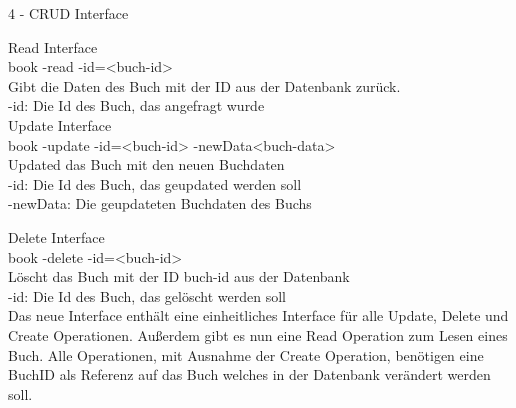 \documentclass[a4paper]{article}
\begin{document}
\begin{exercise}{4 - CRUD Interface}
\begin{itemize}
Read Interface\\
book -read -id=<buch-id>\\
  Gibt die Daten des Buch mit der ID aus der Datenbank zurück.\\
  -id: Die Id des Buch, das angefragt wurde\\

Update Interface\\
book -update -id=<buch-id> -newData<buch-data>\\
  Updated das Buch mit den neuen Buchdaten\\
  -id: Die Id des Buch, das geupdated werden soll\\
  -newData: Die geupdateten Buchdaten des Buchs 

Delete Interface\\
book -delete -id=<buch-id>\\
  Löscht das Buch mit der ID buch-id aus der Datenbank\\
  -id: Die Id des Buch, das gelöscht werden soll\\

Das neue Interface enthält eine einheitliches Interface für alle Update, Delete und Create Operationen. Außerdem gibt es nun eine Read Operation zum Lesen eines Buch.
Alle Operationen, mit Ausnahme der Create Operation, benötigen eine BuchID als Referenz auf das Buch welches in der Datenbank verändert werden soll.  

\end{itemize}
\end{exercise}
\end{document}
